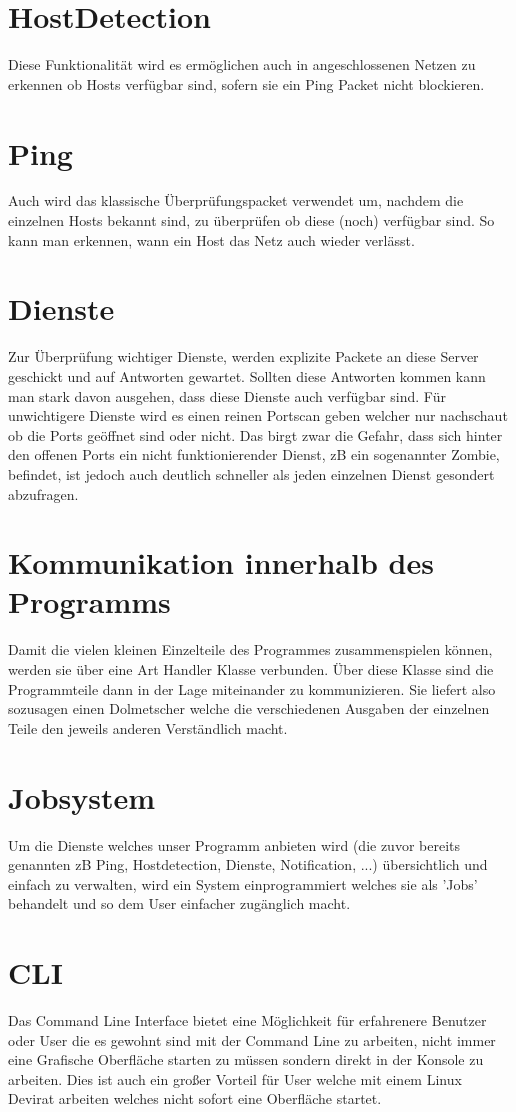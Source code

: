 \documentclass[10pt,a4paper]{report}
\begin{document}
\section{HostDetection}
Diese Funktionalität wird es ermöglichen auch in angeschlossenen Netzen zu erkennen ob Hosts verfügbar sind, sofern sie ein Ping Packet nicht blockieren.
\section{Ping}
Auch wird das klassische Überprüfungspacket verwendet um, nachdem die einzelnen Hosts bekannt sind, zu überprüfen ob diese (noch) verfügbar sind. So kann man erkennen, wann ein Host das Netz auch wieder verlässt. 
\section{Dienste}
Zur Überprüfung wichtiger Dienste, werden explizite Packete an diese Server geschickt und auf Antworten gewartet. Sollten diese Antworten kommen kann man stark davon ausgehen, dass diese Dienste auch verfügbar sind. Für unwichtigere Dienste wird es einen reinen Portscan geben welcher nur nachschaut ob die Ports geöffnet sind oder nicht. Das birgt zwar die Gefahr, dass sich hinter den offenen Ports ein nicht funktionierender Dienst, zB ein sogenannter Zombie, befindet, ist jedoch auch deutlich schneller als jeden einzelnen Dienst gesondert abzufragen. 
\section{Kommunikation innerhalb des Programms}
Damit die vielen kleinen Einzelteile des Programmes zusammenspielen können, werden sie über eine Art Handler Klasse verbunden. Über diese Klasse sind die Programmteile dann in der Lage miteinander zu kommunizieren. Sie liefert also sozusagen einen Dolmetscher welche die verschiedenen Ausgaben der einzelnen Teile den jeweils anderen Verständlich macht. 
\section{Jobsystem}
Um die Dienste welches unser Programm anbieten wird (die zuvor bereits genannten zB Ping, Hostdetection, Dienste, Notification, ...) übersichtlich und einfach zu verwalten, wird ein System einprogrammiert welches sie als 'Jobs' behandelt und so dem User einfacher zugänglich macht. 
\section{CLI}
Das Command Line Interface bietet eine Möglichkeit für erfahrenere Benutzer oder User die es gewohnt sind mit der Command Line zu arbeiten, nicht immer eine Grafische Oberfläche starten zu müssen sondern direkt in der Konsole zu arbeiten. Dies ist auch ein großer Vorteil für User welche mit einem Linux Devirat arbeiten welches nicht sofort eine Oberfläche startet. 
\end{document}
